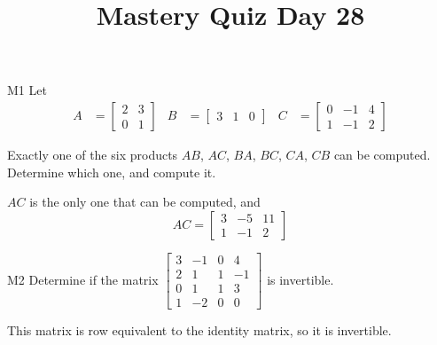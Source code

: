 \documentclass{sbgLAquiz}
\title{Mastery Quiz Day 28 }
\begin{document}
\begin{problem}{M1}
Let 
\begin{align*}
A &= \begin{bmatrix} 2 & 3 \\ 0 & 1 \end{bmatrix} & B&= \begin{bmatrix} 3 & 1 & 0 \end{bmatrix} & C&= \begin{bmatrix} 0 & -1 & 4 \\ 1 & -1 & 2 \end{bmatrix}
\end{align*}

Exactly one of the six products $AB$, $AC$, $BA$, $BC$, $CA$, $CB$ can be computed.  Determine which one, and compute it.
\end{problem}
\begin{solution}
$AC$ is the only one that can be computed, and 
$$AC = \begin{bmatrix} 3 & -5 & 11 \\ 1 & -1 & 2 \end{bmatrix}$$
\end{solution}

\begin{problem}{M2}
Determine if the matrix $\begin{bmatrix} 3 & -1 & 0 & 4 \\ 2 & 1 & 1 & -1 \\ 0 & 1 & 1 & 3 \\ 1 & -2 & 0 & 0 \end{bmatrix}$ is invertible.
\end{problem}
\begin{solution}
This matrix is row equivalent to the identity matrix, so it is invertible.
\end{solution}
\end{document}
